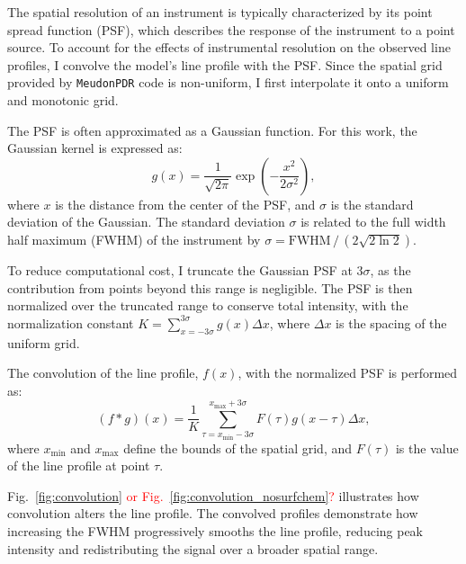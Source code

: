 \documentclass[12pt,a4paper]{article}
\newcommand{\mdpdr}{\texttt{MeudonPDR} code}
\newcommand{\qt}[1]{\textcolor{red}{#1}}
\begin{document}
The spatial resolution of an instrument is typically characterized by its point spread function (PSF), which describes the response of the instrument to a point source. To account for the effects of instrumental resolution on the observed line profiles, I convolve the model's line profile with the PSF. Since the spatial grid provided by \mdpdr{} is non-uniform, I first interpolate it onto a uniform and monotonic grid.

The PSF is often approximated as a Gaussian function. For this work, the Gaussian kernel is expressed as:
\begin{equation}
    g(x) = \frac{1}{\sqrt{2\pi}}\exp(-\frac{x^2}{2\sigma^2}),
\end{equation}
where $x$ is the distance from the center of the PSF, and $\sigma$ is the standard deviation of the Gaussian. The standard deviation $\sigma$ is related to the full width half maximum (FWHM) of the instrument by $\sigma = \text{FWHM}\,/\,(2\sqrt{2 \ln 2})$.

To reduce computational cost, I truncate the Gaussian PSF at $3\sigma$, as the contribution from points beyond this range is negligible. The PSF is then normalized over the truncated range to conserve total intensity, with the normalization constant $K = \sum_{x=-3\sigma}^{3\sigma} g(x) \Delta x$, where $\Delta x$ is the spacing of the uniform grid.

The convolution of the line profile, $f(x)$, with the normalized PSF is performed as:
\begin{equation}
    (f * g) (x) = \frac{1}{K} \sum_{\tau = x_{\min} - 3\sigma}^{x_{\max} + 3\sigma}F(\tau)g(x - \tau)\Delta x,
\end{equation}
where $x_{\min}$ and $x_{\max}$ define the bounds of the spatial grid, and $F(\tau)$ is the value of the line profile at point $\tau$. 

Fig.~\ref{fig:convolution} \qt{or Fig.~\ref{fig:convolution_nosurfchem}?} illustrates how convolution alters the line profile. The convolved profiles demonstrate how increasing the FWHM progressively smooths the line profile, reducing peak intensity and redistributing the signal over a broader spatial range.

\end{document}
